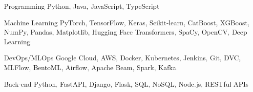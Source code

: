 

\begin{cvskills}

\cvskill
{Programming} %
{Python, Java, JavaScript, TypeScript} %

\cvskill
{Machine Learning} %
{PyTorch, TensorFlow, Keras, Scikit-learn, CatBoost, XGBoost, NumPy, Pandas, Matplotlib, Hugging Face Transformers, SpaCy, OpenCV, Deep Learning} %

\cvskill
{DevOps/MLOps} %
{Google Cloud, AWS, Docker, Kubernetes, Jenkins, Git, DVC, MLFlow, BentoML, Airflow, Apache Beam, Spark, Kafka} %

\cvskill
{Back-end} %
{Python, FastAPI, Django, Flask, SQL, NoSQL, Node.js, RESTful APIs} %




\end{cvskills}
